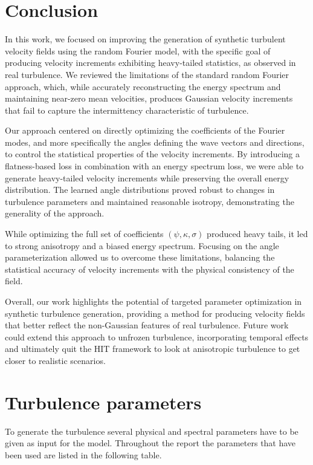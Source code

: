 \documentclass[a4paper,12pt]{article}
\theoremstyle{definition}
\begin{document}
\section{Conclusion}
In this work, we focused on improving the generation of synthetic turbulent velocity fields using the random Fourier model, with the specific goal of producing velocity increments exhibiting heavy-tailed statistics, as observed in real turbulence. We reviewed the limitations of the standard random Fourier approach, which, while accurately reconstructing the energy spectrum and maintaining near-zero mean velocities, produces Gaussian velocity increments that fail to capture the intermittency characteristic of turbulence.

\bigskip
Our approach centered on directly optimizing the coefficients of the Fourier modes, and more specifically the angles defining the wave vectors and directions, to control the statistical properties of the velocity increments. By introducing a flatness-based loss in combination with an energy spectrum loss, we were able to generate heavy-tailed velocity increments while preserving the overall energy distribution. The learned angle distributions proved robust to changes in turbulence parameters and maintained reasonable isotropy, demonstrating the generality of the approach.

\bigskip
While optimizing the full set of coefficients 
$(\psi,\kappa,\sigma)$
 produced heavy tails, it led to strong anisotropy and a biased energy spectrum. Focusing on the angle parameterization allowed us to overcome these limitations, balancing the statistical accuracy of velocity increments with the physical consistency of the field.

 \bigskip
Overall, our work highlights the potential of targeted parameter optimization in synthetic turbulence generation, providing a method for producing velocity fields that better reflect the non-Gaussian features of real turbulence. Future work could extend this approach to unfrozen turbulence, incorporating temporal effects and ultimately quit the HIT framework to look at anisotropic turbulence to get closer to realistic scenarios. 


\newpage
\appendix

\section{Turbulence parameters}
To generate the turbulence several physical and spectral parameters have to be given as input for the model. Throughout the report the parameters that have been used are listed in the following table. 
\end{document}
